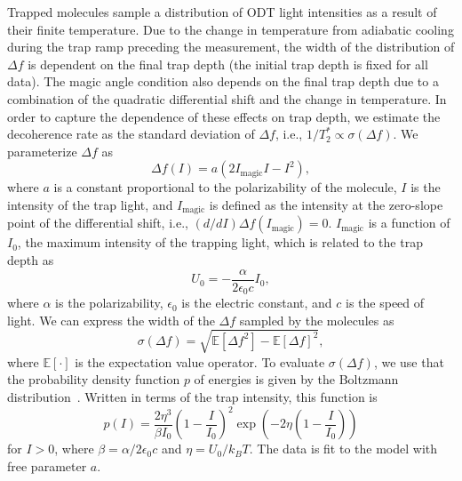 \documentclass[
superscriptaddress,
twocolumn,
amsmath,amssymb,
aps,
prx,
nofootinbib,
]{revtex4-2}
\begin{document}
Trapped molecules sample a distribution of ODT light intensities as a result of their finite temperature. Due to the change in temperature from adiabatic cooling during the trap ramp preceding the measurement, the width of the distribution of $\Delta f$ is dependent on the final trap depth (the initial trap depth is fixed for all data). The magic angle condition also depends on the final trap depth due to a combination of the quadratic differential shift and the change in temperature.
In order to capture the dependence of these effects on trap depth, we estimate the decoherence rate as the standard deviation of $\Delta f$, i.e., $1/T_2^* \propto \sigma(\Delta f)$.
We parameterize $\Delta f$ as
$$
    \Delta f(I) = a\left(2 I_{\text{magic}}I-I^2\right),
$$
where $a$ is a constant proportional to the polarizability of the molecule, $I$ is the intensity of the trap light, and $I_{\text{magic}}$ is defined as the intensity at the zero-slope point of the differential shift, i.e., $(d/dI)\Delta f(I_\text{magic}) = 0$. $I_{\text{magic}}$ is a function of $I_0$, the maximum intensity of the trapping light, which is related to the trap depth as
$$
    U_0 = -\frac{\alpha}{2\epsilon_0c} I_0,
$$
where $\alpha$ is the polarizability, $\epsilon_0$ is the electric constant, and $c$ is the speed of light. We can express the width of the $\Delta f$ sampled by the molecules as
$$
    \sigma(\Delta f) = \sqrt{\mathbb{E}[\Delta f^2] - \mathbb{E}[\Delta f]^2},
$$
where $\mathbb{E}[\cdot]$ is the expectation value operator. To evaluate $\sigma(\Delta f)$, we use that the probability density function $p$ of energies is given by the  Boltzmann distribution~\cite{Kuhr2005analysis,Tuchendler2008energy}. Written in terms of the trap intensity, this function is
$$
    p(I) = \frac{2\eta^3}{\beta I_0}\left(1-\frac{I}{I_0}\right)^2\exp\left(-2\eta\left(1-\frac{I}{I_0}\right)\right)
$$
for $I > 0$, where $\beta = \alpha/2\epsilon_0 c$ and $\eta = U_0/k_BT$. The data is fit to the model with free parameter $a$.
\end{document}
